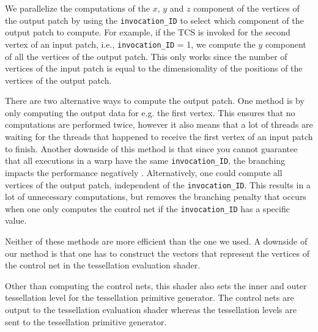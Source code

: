 		We parallelize the computations of the $x$, $y$ and $z$ component of the vertices of the output patch by using the \texttt{invocation\_ID} to select which component of the output patch to compute. For example, if the TCS is invoked for the second vertex of an input patch, i.e., \texttt{invocation\_ID} = 1, we compute the $y$ component of all the vertices of the output patch. This only works since the number of vertices of the input patch is equal to the dimensionality of the positions of the vertices of the output patch.

		There are two alternative ways to compute the output patch. One method is by only computing the output data for e.g. the first vertex. This ensures that no computations are performed twice, however it also means that a lot of threads are waiting for the threads that happened to receive the first vertex of an input patch to finish. Another downside of this method is that since you cannot guarantee that all executions in a warp have the same \texttt{invocation\_ID}, the branching impacts the performance negatively \cite{fung2007dynamic}.
		Alternatively, one could compute all vertices of the output patch, independent of the \texttt{invocation\_ID}. This results in a lot of unnecessary computations, but removes the branching penalty that occurs when one only computes the control net if the \texttt{invocation\_ID} has a specific value. 

		Neither of these methods are more efficient than the one we used. A downside of our method is that one has to construct the vectors that represent the vertices of the control net in the tessellation evaluation shader. 

		Other than computing the control nets, this shader also sets the inner and outer tessellation level for the tessellation primitive generator. 
		The control nets are output to the tessellation evaluation shader whereas the tessellation levels are sent to the tessellation primitive generator. 

